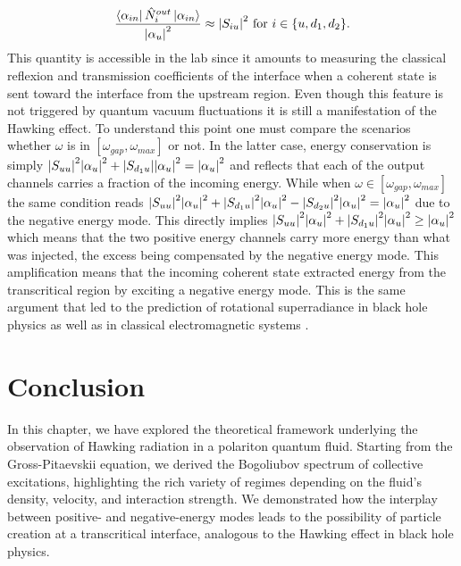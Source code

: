 \begin{equation}
    \dfrac{\bra{\alpha_{in}}\hat{N}_i^{out}\ket{\alpha_{in}}}{\abs{\alpha_u}^2} \approx \abs{S_{i u}}^2 \ \mathrm{for} \ i\in\{u,d_1,d_2\}.
\end{equation}
This quantity is accessible in the lab since it amounts to measuring the classical reflexion and transmission coefficients of the interface when a
coherent state is sent toward the interface from the upstream region. Even though this feature is not triggered by quantum vacuum 
fluctuations it is still a manifestation of the Hawking effect. To understand this point one must compare the scenarios
whether $\omega$ is in $[\omega_{gap}, \omega_{max}]$ or not. In the latter case, energy conservation is simply $\abs{S_{uu}}^2\abs{\alpha_u}^2+\abs{S_{d_1u}}\abs{\alpha_u}^2=\abs{\alpha_u}^2$ and reflects that each of the output channels
carries a fraction of the incoming energy. While when $\omega \in [\omega_{gap}, \omega_{max}]$ the same condition reads $\abs{S_{uu}}^2\abs{\alpha_u}^2+\abs{S_{d_1u}}^2\abs{\alpha_u}^2-\abs{S_{d_2u}}^2\abs{\alpha_u}^2=\abs{\alpha_u}^2$ due to the negative energy mode.
This directly implies $\abs{S_{uu}}^2\abs{\alpha_u}^2+\abs{S_{d_1u}}^2\abs{\alpha_u}^2\geq \abs{\alpha_u}^2$ which means that the two positive energy channels
carry more energy than what was injected, the excess being compensated by the negative energy mode. This amplification means that the incoming 
coherent state extracted energy from the transcritical region by exciting a negative energy mode. This is the same 
argument that led to the prediction of rotational superradiance in black hole physics \cite{hawking_black_1972} as well as in classical electromagnetic systems \cite{zeldovich__1970}.

\section{Conclusion}

In this chapter, we have explored the theoretical framework underlying the observation of Hawking radiation in a polariton quantum fluid. Starting from the Gross-Pitaevskii equation, we derived the Bogoliubov spectrum of collective excitations, highlighting the rich variety of regimes depending on the fluid's density, velocity, and interaction strength. We demonstrated how the interplay between positive- and negative-energy modes leads to the possibility of particle creation at a transcritical interface, analogous to the Hawking effect in black hole physics.

